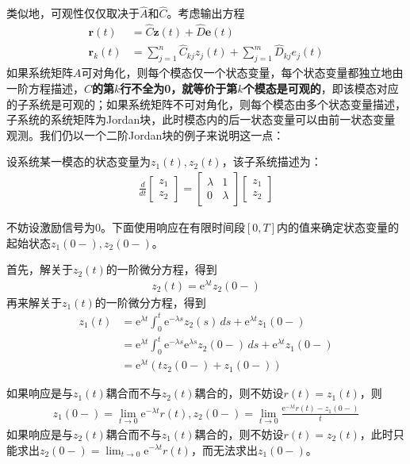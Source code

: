 \documentclass{ctexbook}
\begin{document}
类似地，可观性仅仅取决于$\hat{A}$和$\hat{C}$。考虑输出方程\begin{align*}
    \mathbf{r}(t)&=\hat{C}\mathbf{z}(t)+\hat{D}\mathbf{e}(t)\\
    \mathbf{r}_k(t)&=\sum_{j=1}^n \hat{C}_{kj} z_j(t)+\sum_{j=1}^m \hat{D}_{kj} e_j(t)
\end{align*}
如果系统矩阵$A$可对角化，则每个模态仅一个状态变量，每个状态变量都独立地由一阶方程描述，\textbf{$\hat{C}$的第$k$行不全为0，就等价于第$k$个模态是可观的}，即该模态对应的子系统是可观的；如果系统矩阵不可对角化，则每个模态由多个状态变量描述，子系统的系统矩阵为Jordan块，此时模态内的后一状态变量可以由前一状态变量观测。我们仍以一个二阶Jordan块的例子来说明这一点：
\begin{example}
    设系统某一模态的状态变量为$z_1(t),z_2(t)$，该子系统描述为：\begin{align*}
    \frac{d}{dt}\begin{bmatrix}
    z_1\\
    z_2
    \end{bmatrix}=\begin{bmatrix}
    \lambda & 1\\
    0 & \lambda
    \end{bmatrix}\begin{bmatrix}
    z_1\\
    z_2
    \end{bmatrix}
    \end{align*}

    不妨设激励信号为0。下面使用响应在有限时间段$[0,T]$内的值来确定状态变量的起始状态$z_1(0-),z_2(0-)$。

    首先，解关于$z_2(t)$的一阶微分方程，得到\begin{align*}
    z_2(t)=\mathrm{e}^{\lambda t}z_2(0-)
    \end{align*}
    再来解关于$z_1(t)$的一阶微分方程，得到\begin{align*}
    z_1(t)&=\mathrm{e}^{\lambda t}\int_0^t \mathrm{e}^{-\lambda s}z_2(s)\,ds+\mathrm{e}^{\lambda t}z_1(0-)\\
    &=\mathrm{e}^{\lambda t}\int_0^t \mathrm{e}^{-\lambda s}\mathrm{e}^{\lambda s}z_2(0-)\,ds+\mathrm{e}^{\lambda t}z_1(0-)\\
    &=\mathrm{e}^{\lambda t}(tz_2(0-)+z_1(0-))
    \end{align*}

    如果响应是与$z_1(t)$耦合而不与$z_2(t)$耦合的，则不妨设$r(t)=z_1(t)$，则\begin{align*}
    z_1(0-)=\lim_{t\to 0} \mathrm{e}^{-\lambda t}r(t),z_2(0-)=\lim_{t\to 0} \frac{\mathrm{e}^{-\lambda t}r(t)-z_1(0-)}{t}
    \end{align*}
    如果响应是与$z_2(t)$耦合而不与$z_1(t)$耦合的，则不妨设$r(t)=z_2(t)$，此时只能求出$z_2(0-)=\lim_{t\to 0} \mathrm{e}^{-\lambda t}r(t)$，而无法求出$z_1(0-)$。
\end{example}
\end{document}
